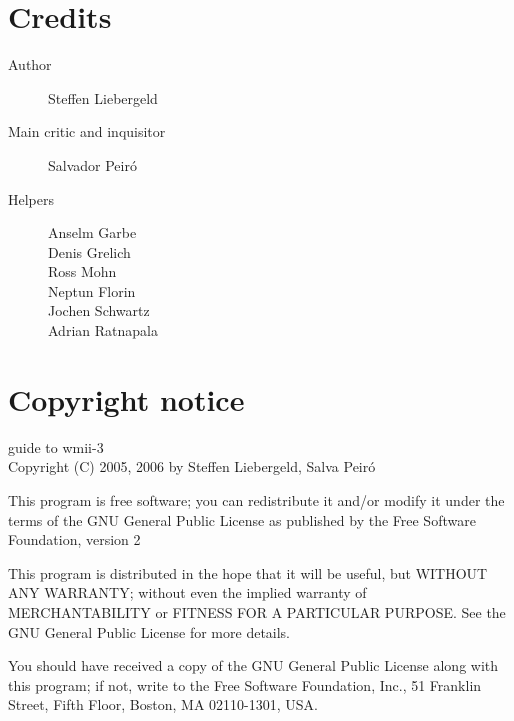 \documentclass[12pt,a4paper]{article} %
\begin{document}
\newpage

\section{Credits}
\label{sec:credits}


\begin{description}
\item [Author] Steffen Liebergeld
\item [Main critic and inquisitor] Salvador Peir\'o

\item [Helpers]
Anselm Garbe \\
Denis Grelich \\
Ross Mohn \\
Neptun Florin \\
Jochen Schwartz \\
Adrian Ratnapala \\
\end{description}

\section{Copyright notice}

guide to wmii-3\\
Copyright (C) 2005, 2006 by Steffen Liebergeld, Salva Peir\'o

This program is free software; you can redistribute it and/or modify
it under the terms of the GNU General Public License as published by
the Free Software Foundation, version 2

This program is distributed in the hope that it will be useful, but
WITHOUT ANY WARRANTY; without even the implied warranty of
MERCHANTABILITY or FITNESS FOR A PARTICULAR PURPOSE.  See the GNU
General Public License for more details.

You should have received a copy of the GNU General Public License
along with this program; if not, write to the Free Software
Foundation, Inc., 51 Franklin Street, Fifth Floor, Boston, MA
02110-1301, USA.
\end{document}
